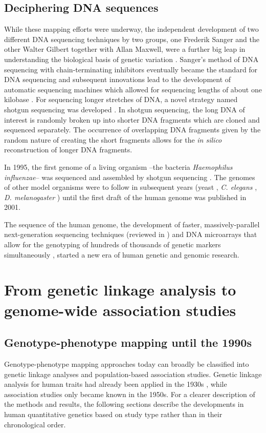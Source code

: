 \subsection{Deciphering DNA sequences}
While these mapping efforts were underway, the independent development of two different DNA sequencing techniques by two groups, one Frederik Sanger and the other Walter Gilbert together with Allan Maxwell, were a further big leap in understanding the biological basis of genetic variation \citep{Sanger1977,Maxam1977}. Sanger's method of DNA sequencing with chain-terminating inhibitors eventually became the standard for DNA sequencing and subsequent innovations lead to the development of automatic sequencing machines which allowed for sequencing lengths of about one kilobase \citep{Hunkapiller1991}. For sequencing longer stretches of DNA, a novel strategy named shotgun sequencing was developed \citep{Staden1979,Anderson1981}. In shotgun sequencing, the long DNA of interest is randomly broken up into shorter DNA fragments which are cloned and sequenced separately. The occurrence of overlapping DNA fragments given by the random nature of creating the short fragments allows for the \textit{in silico} reconstruction of longer DNA fragments.

In 1995, the first genome of a living organism --the bacteria \textit{Haemophilus influenzae}-- was sequenced and assembled by shotgun sequencing \citep{Fleischmann1995}. The genomes of other model organisms were to follow in subsequent years (yeast \citep{Goffeau1996}, \textit{C. elegans} \citep{C.elegans1998}, \textit{D. melanogaster} \citep{Adams2000}) until the first draft of the human genome was published in 2001\citep{Lander2001}. 

The sequence of the human genome, the development of faster, massively-parallel next-generation sequencing techniques (reviewed in \citep{Shendure2008,Heather2016}) and DNA microarrays that allow for the genotyping of hundreds of thousands of genetic markers simultaneously \citep{Wang1998}, started a new era of human genetic and genomic research. 

\section{From genetic linkage analysis to genome-wide association studies}
\subsection{Genotype-phenotype mapping until the 1990s}
Genotype-phenotype mapping approaches today can broadly be classified into genetic linkage analyses and population-based association studies. Genetic linkage analysis for human traits had already been applied in the 1930s \citep{Bernstein1930,Penrose1935}, while association studies only became known in the 1950s. For a clearer description of the methods and results, the following sections describe the developments in human quantitative genetics based on study type rather than in their chronological order. 

